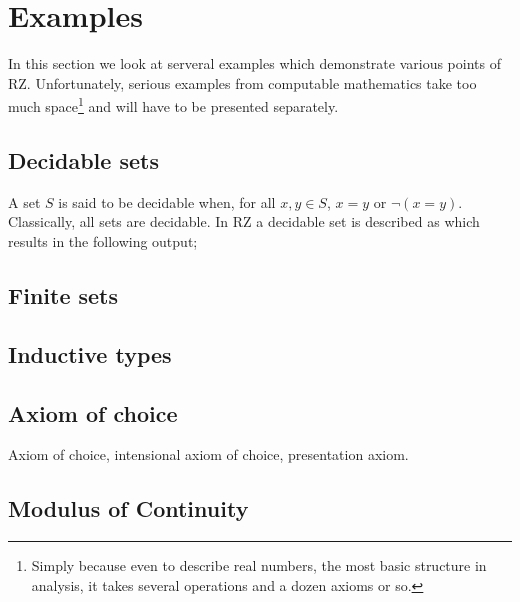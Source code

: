 \section{Examples}
\label{sec:examples}

In this section we look at serveral examples which demonstrate various
points of RZ. Unfortunately, serious examples from computable
mathematics take too much space\footnote{Simply because even to
  describe real numbers, the most basic structure in analysis, it
  takes several operations and a dozen axioms or so.} and will have to
be presented separately.

\subsection{Decidable sets}
\label{sec:decidable-sets}

A set $S$ is said to be decidable when, for all $x, y \in S$, $x = y$
or $\lnot (x = y)$. Classically, all sets are decidable. In RZ a
decidable set is described as
%
%
which results in the following output;
%

\subsection{Finite sets}
\label{sec:finite-sets}


\subsection{Inductive types}
\label{sec:inductive-types}



\subsection{Axiom of choice}
\label{sec:axiom-choice}

Axiom of choice, intensional axiom of choice, presentation axiom.


\subsection{Modulus of Continuity}
\label{sec:we-show-modulus-of-continuity-example}

